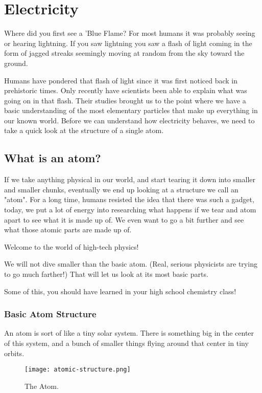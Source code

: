 \chapter{Electricity}

Where did you first see a 'Blue Flame? For most humans it was probably seeing
or hearing lightning. If you saw lightning you saw a flash of light coming in
the form of jagged streaks seemingly moving at random from the sky toward the
ground. 

Humans have pondered that flash of light since it was first noticed back in
prehistoric times. Only recently have scientists been able to explain what was
going on in that flash.  Their studies brought us to the point where we have a
basic understanding of the most elementary particles that make up everything in
our known world.  Before we can understand how electricity behaves, we need to
take a quick look at the structure of a single atom.

\section{What is an atom?}
If we take anything physical in our world, and start tearing it down into
smaller and smaller chunks, eventually we end up looking at a structure we call
an "atom". For a long time, humans resisted the idea that there was such a
gadget, today, we put a lot of energy into researching what happens if we tear
and atom apart to see what it is made up of. We even want to go a bit further and
see what those atomic parts are made up of.

Welcome to the world of high-tech physics!

We will not dive smaller than the basic atom. (Real, serious physicists are
trying to go much farther!) That will let us look at its most basic parts.

Some of this, you should have learned in your high school chemistry class!

\subsection{Basic Atom Structure}
An atom is sort of like a tiny solar system. There is something big in the
center of this system, and a bunch of smaller things flying around that center
in tiny orbits.

\begin{figure}[ht]
  \caption{The Atom.}
  \centering
  \texttt{[image: atomic-structure.png]}
\end{figure}

